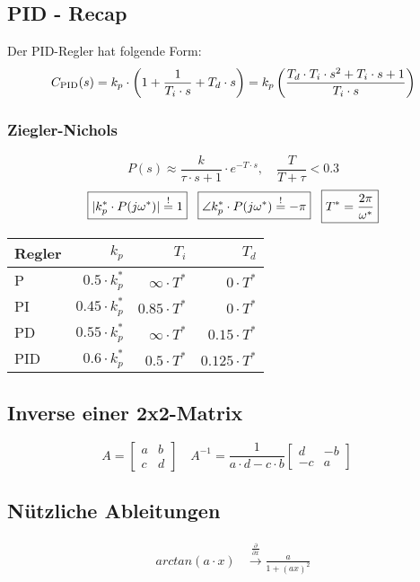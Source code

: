 \subsection{PID - Recap}
    Der PID-Regler hat folgende Form:
    \begin{equation*}
        C_{\textnormal{PID}}(s) = k_p\cdot\left(1 + \frac{1}{T_i\cdot s} + T_d\cdot s\right) = k_p\left(\frac{T_d\cdot T_i\cdot s^2 + T_i\cdot s + 1}{T_i\cdot s}\right)
    \end{equation*}
    
    \subsubsection{Ziegler-Nichols}
    \begin{equation*}
        P(s) \approx \frac{k}{\tau\cdot s + 1}\cdot e^{-T\cdot s}, \quad \frac{T}{T+\tau} < 0.3
    \end{equation*}
        \begin{equation*}
            \boxed{|k_p^* \cdot P(j\omega^*)| \overset{!}{=} 1} \hspace{3mm}
            \boxed{\angle k_p^* \cdot P(j\omega^*)\overset{!}{=}-\pi} \hspace{3mm}
            \boxed{T^* =\frac{2\pi}{\omega^*}}
        \end{equation*}
        \begin{center}
        {\renewcommand{\arraystretch}{1.2}
            \begin{tabular}{l r r r}
            Regler & $k_p$ & $T_i$ & $T_d$ \\
                 \hline
                P & $0.5\cdot k_p^*$ & $\infty \cdot T^*$ & $0 \cdot T^*$ \\
                PI & $0.45\cdot k_p^*$ & $0.85\cdot T^*$ & $0 \cdot T^*$\\
                PD & $0.55 \cdot k_p^* $& $\infty \cdot T^*$ &  $0.15\cdot T^*$\\
                PID & $0.6\cdot k_p^*$ & $0.5 \cdot T^*$ & $0.125 \cdot T^*$\\
            \end{tabular}}
        \end{center}

\subsection{Inverse einer 2x2-Matrix}
    \begin{equation*}
        A = \begin{bmatrix} a & b \\ c & d \end{bmatrix}\quad
        A^{-1} = \frac{1}{a\cdot d - c\cdot b}\begin{bmatrix} d & -b \\ -c & a \end{bmatrix}\quad
    \end{equation*}
\subsection{Nützliche Ableitungen}
    \begin{align*}
        arctan(a \cdot x) &\xrightarrow{\frac{\partial}{\partial x}} \frac{a}{1+(ax)^2}\\ 
    \end{align*}